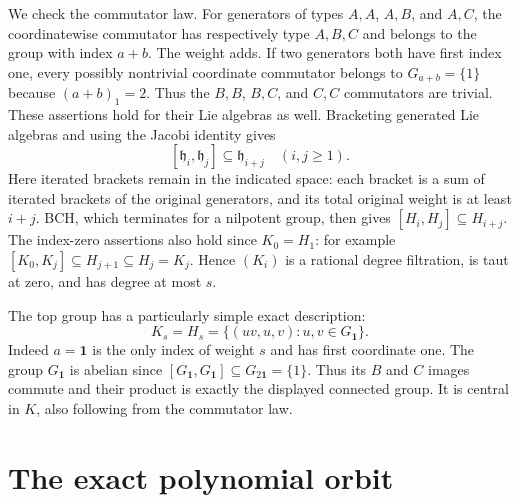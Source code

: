 \documentclass[11pt]{article}
\newcommand{\one}{\mathbf 1}
\begin{document}
We check the commutator law. For generators of types $A,A$, $A,B$, and
$A,C$, the coordinatewise commutator has respectively type $A,B,C$ and
belongs to the group with index $a+b$. The weight adds.
If two generators both have first index one, every possibly nontrivial
coordinate commutator belongs to $G_{a+b}=\{1\}$ because
$(a+b)_1=2$. Thus the $B,B$, $B,C$, and $C,C$ commutators are trivial.
These assertions hold for their Lie algebras as well. Bracketing generated
Lie algebras and using the Jacobi identity gives
\[
 [\mathfrak h_i,\mathfrak h_j]\subseteq\mathfrak h_{i+j}
 \quad (i,j\geq1).
\]
Here iterated brackets remain in the indicated space: each bracket is a sum
of iterated brackets of the original generators, and its total original
weight is at least $i+j$. BCH, which terminates for a nilpotent group,
then gives $[H_i,H_j]\subseteq H_{i+j}$. The index-zero assertions also
hold since $K_0=H_1$: for example
$[K_0,K_j]\subseteq H_{j+1}\subseteq H_j=K_j$.
Hence $(K_i)$ is a rational degree filtration, is taut at zero, and has
degree at most $s$.

The top group has a particularly simple exact description:
\begin{equation}\label{eq:top}
 K_s=H_s=\{(uv,u,v):u,v\in G_{\one}\}.
\end{equation}
Indeed $a=\one$ is the only index of weight $s$ and has first coordinate
one. The group $G_{\one}$ is abelian since
$[G_{\one},G_{\one}]\subseteq G_{2\one}=\{1\}$. Thus its $B$ and $C$
images commute and their product is exactly the displayed connected group.
It is central in $K$, also following from the commutator law.

\section{The exact polynomial orbit}
\end{document}
